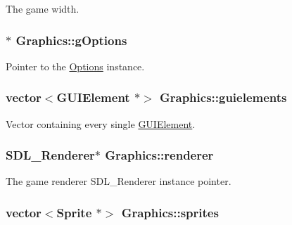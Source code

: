 The game width. 

\hypertarget{class_graphics_aafe6ff08323ccbe6478472e3ec30715c}{
\subsubsection[{g\-Options}]{$\ast$ Graphics\-::g\-Options\hspace{0.3cm}{\ttfamily [protected]}}}\label{class_graphics_aafe6ff08323ccbe6478472e3ec30715c}


Pointer to the \hyperlink{class_options}{Options} instance. 

\hypertarget{class_graphics_ac4ea71ee39d3cbc7b3fc14bf89fa400f}{
\subsubsection[{guielements}]{\setlength{\rightskip}{0pt plus 5cm}vector$<${\bf G\-U\-I\-Element} $\ast$$>$ Graphics\-::guielements\hspace{0.3cm}{\ttfamily [protected]}}}\label{class_graphics_ac4ea71ee39d3cbc7b3fc14bf89fa400f}


Vector containing every single \hyperlink{class_g_u_i_element}{G\-U\-I\-Element}. 

\hypertarget{class_graphics_afee9119ae93eafc5707a9e868b539a2e}{
\subsubsection[{renderer}]{\setlength{\rightskip}{0pt plus 5cm}S\-D\-L\-\_\-\-Renderer$\ast$ Graphics\-::renderer}}\label{class_graphics_afee9119ae93eafc5707a9e868b539a2e}


The game renderer S\-D\-L\-\_\-\-Renderer instance pointer. 

\hypertarget{class_graphics_ad01e5a24a1ce34c64f6dd7de4f85fc8b}{
\subsubsection[{sprites}]{\setlength{\rightskip}{0pt plus 5cm}vector$<${\bf Sprite} $\ast$$>$ Graphics\-::sprites\hspace{0.3cm}{\ttfamily [protected]}}}\label{class_graphics_ad01e5a24a1ce34c64f6dd7de4f85fc8b}


